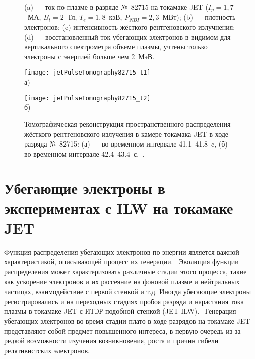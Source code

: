 \begin{figure}[ht!]
  \caption{ (a) --- ток по плазме в разряде №~82715 на токамаке JET ($I_p = 1,7$~МА, $B_t = 2$~Тл, $T_e = 1,8$~кэВ, $P_{NBI} = 2,3$~МВт); (b) ---  плотность электронов; (c) интенсивность жёсткого рентгеновского излучнения; (d) --- восстановленный ток убегающих электронов в видимом для вертикального спектрометра объеме плазмы, учтены только электроны с энергией больше чем 2~МэВ.~\cite{Shevelev2013} }
  \label{fig:jetPulseParams82715}
\end{figure}

\begin{figure}[ht]
    \begin{minipage}[b][][b]{0.48\linewidth}\centering
        \texttt{[image: jetPulseTomography82715\_t1]} \\ а)
    \end{minipage}
    \hfill
    \begin{minipage}[b][][b]{0.48\linewidth}\centering
        \texttt{[image: jetPulseTomography82715\_t2]} \\ б)
    \end{minipage}
    \caption{ Томографическая реконструкция пространственного распределения жёсткого рентгеновского излучения в камере токамака JET в ходе разряда №~82715: (а) --- во временном интервале 41.1--41.8~c, (б) --- во временном интервале 42.4--43.4~с.~\cite{Shevelev2013a}. }
    \label{fig:jetPulseTomography82715}
\end{figure}


\FloatBarrier
\section{Убегающие электроны в экспериментах с ILW на токамаке JET}

Функция распределения убегающих электронов по энергии является важной характеристикой, описывающей процесс их генерации.~\cite{Plyusnin2015} Эволюция функции распределения может характеризовать различные стадии этого процесса, такие как ускорение электронов и их рассеяние на фоновой плазме и нейтральных частицах, взаимодействие с первой стенкой и т.д. Иногда убегающие электроны регистрировались и на переходных стадиях пробоя разряда и нарастания тока плазмы в токамаке JET с ИТЭР-подобной стенкой (JET-ILW).~\cite{Plyusnin2015} Генерация убегающих электронов во время стадии плато в ходе разрядов на токамаке JET представляют собой предмет повышенного интереса, в первую очередь из-за редкой возможности изучения возникновения, роста и причин гибели релятивистских электронов.~\cite{Granetz2014} 

